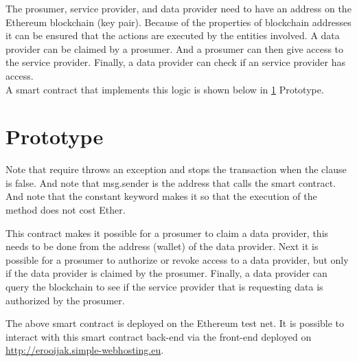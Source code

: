 \documentclass[paper=a4, fontsize=11pt]{scrartcl}
\numberwithin{equation}{section} %
\numberwithin{figure}{section}   %
\numberwithin{table}{section}    %
\begin{document}
The prosumer, service provider, and data provider need to have an address on the
Ethereum blockchain (key pair). Because of the properties of blockchain
addresses it can be ensured that the actions are executed by the entities
involved. A data provider can be claimed by a prosumer. And a prosumer can then
give access to the service provider. Finally, a data provider can check if an
service provider has access.\\

A smart contract that implements this logic is shown below in \ref{prototype} Prototype.\\

\section{Prototype}
\label{prototype}

%


Note that require throws an exception and stops the transaction when the clause
is false. And note that msg.sender is the address that calls the smart contract.
And note that the constant keyword makes it so that the execution of the method
does not cost Ether.

This contract makes it possible for a prosumer to claim a data provider, this
needs to be done from the address (wallet) of the data provider. Next it is
possible for a prosumer to authorize or revoke access to a data provider, but
only if the data provider is claimed by the prosumer. Finally, a data provider
can query the blockchain to see if the service provider that is requesting data
is authorized by the prosumer.

The above smart contract is deployed on the Ethereum test net. It is possible to
interact with this smart contract back-end via the front-end deployed on
\url{http://erooijak.simple-webhosting.eu}.\\
\end{document}
